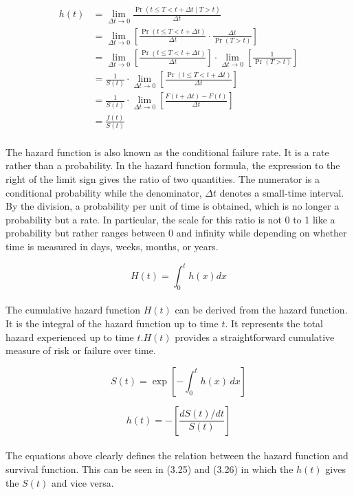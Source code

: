 \documentclass[doublespacing,12pt]{report}
\begin{document}
\begin{align}
h(t) &= \lim_{\Delta t \to 0} \frac{\Pr(t \leq T < t + \Delta t \mid T > t)}{\Delta t} \\
&= \lim_{\Delta t \to 0} \left[ \frac{\Pr(t \leq T < t + \Delta t)}{\Delta t} \cdot \frac{\Delta t}{\Pr(T > t)} \right] \\
&= \lim_{\Delta t \to 0} \left[ \frac{\Pr(t \leq T < t + \Delta t)}{\Delta t} \right] \cdot \lim_{\Delta t \to 0} \left[ \frac{1}{\Pr(T > t)} \right] \\
&= \frac{1}{S(t)} \cdot \lim_{\Delta t \to 0} \left[ \frac{\Pr(t \leq T < t + \Delta t)}{\Delta t} \right] \\
&= \frac{1}{S(t)} \cdot \lim_{\Delta t \to 0} \left[ \frac{F(t + \Delta t) - F(t)}{\Delta t} \right] \\
&= \frac{f(t)}{S(t)} 
\end{align}\\
The hazard function is also known as the conditional failure rate. It is a rate rather than a probability. In the hazard function formula, the expression to the right of the limit sign gives the ratio of two quantities. The numerator is a conditional probability while the denominator, \(\Delta t\) denotes a small-time interval. By the division, a probability per unit of time is obtained, which is no longer a probability but a rate. In particular, the scale for this ratio is not 0 to 1 like a probability but rather ranges between 0 and infinity while depending on whether time is measured in days, weeks, months, or years. 

\begin{equation}
H(t)=\int_{0}^{t}{h(x)dx}
\end{equation}\\
The cumulative hazard function \(H(t)\) can be derived from the hazard function. It is the integral of the hazard function up to time \(t\). It represents the total hazard experienced up to time \( t. H(t)\) provides a straightforward cumulative measure of risk or failure over time.

\begin{equation}
S(t) = \exp\left[-\int_{0}^{t} h(x) \, dx\right]
\label{eq:survival_function}
\end{equation}

\begin{equation}
h(t) = -\left[\frac{dS(t)/dt}{S(t)}\right]
\end{equation}\\
The equations above clearly defines the relation between the hazard function and survival function. This can be seen in (3.25) and (3.26) in which the $h(t)$ gives the $S(t)$ and vice versa.
\end{document}
